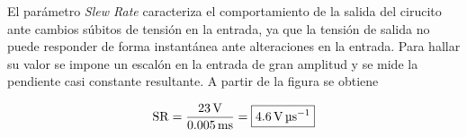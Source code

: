 	El parámetro \textit{Slew Rate} caracteriza el comportamiento de la salida del cirucito ante cambios súbitos de tensión en la entrada, ya que la tensión de salida no puede responder de forma instantánea ante alteraciones en la entrada. Para hallar su valor se impone un escalón en la entrada de gran amplitud y se mide la pendiente casi constante resultante. A partir de la figura se obtiene

	\begin{equation}
		\centering
		\mathrm{SR} = \frac{\SI{23}{\volt}}{\SI{0.005}{\milli\second}} = \boxed{\SI{4.6}{\volt\per\micro\second}}
	\end{equation}


